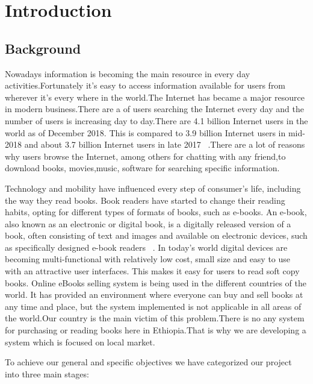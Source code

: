\chapter{Introduction}
\section{Background}
Nowadays information is becoming the main resource in every day activities.Fortunately it's easy to access information available for users from wherever it's every where in the world.The Internet has became a major resource in modern business.There are a of users searching the Internet every day and the number of users is increasing day to day.There are 4.1 billion Internet users in the world as of December 2018. This is compared to 3.9 billion Internet users in mid-2018 and about 3.7 billion Internet users in late 2017 ~\cite{webhosting}.There are a lot of reasons why users browse the Internet, among others for chatting with any friend,to download books, movies,music, software for searching specific information.


Technology and mobility have influenced every step of consumer’s life, including the way they read books. Book readers have started to change their reading habits, opting for different types of formats of books, such as e-books. An e-book, also known as an electronic or digital book, is a digitally released version of a book, often consisting of text and images and available on electronic devices, such as specifically designed e-book readers ~\cite{webstatista}. In today’s world digital devices are becoming multi-functional with relatively low cost, small size and easy to use with an attractive user interfaces. This makes it easy for users  to read  soft copy books.
Online eBooks selling system is being  used in the different countries of the  world. It has provided an environment where everyone can buy and sell books at any time and place, but the system implemented is not applicable in all areas of the world.Our country is the main victim of this problem.There is no any system for purchasing or reading books here in Ethiopia.That is why we are developing a system which is focused on local market.

To achieve our general and specific objectives we have categorized our project into three main stages:

